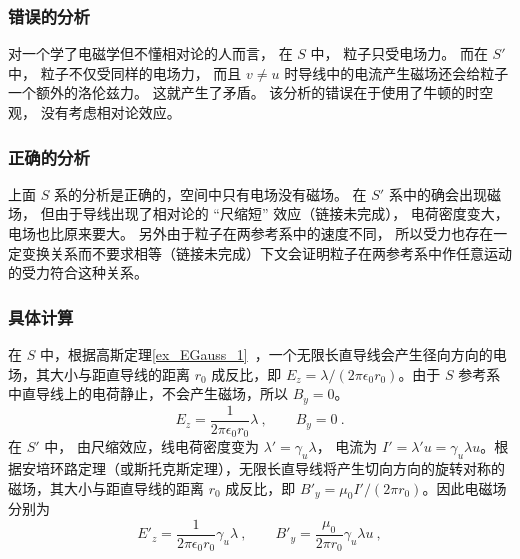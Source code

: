 \subsubsection{错误的分析}
对一个学了电磁学但不懂相对论的人而言， 在 $S$ 中， 粒子只受电场力。 而在 $S'$ 中， 粒子不仅受同样的电场力， 而且 $v \ne u$ 时导线中的电流产生磁场还会给粒子一个额外的洛伦兹力。 这就产生了矛盾。 该分析的错误在于使用了牛顿的时空观， 没有考虑相对论效应。

\subsubsection{正确的分析}
上面 $S$ 系的分析是正确的，空间中只有电场没有磁场。 在 $S'$ 系中的确会出现磁场， 但由于导线出现了相对论的 “尺缩短” 效应（链接未完成）， 电荷密度变大， 电场也比原来要大。 另外由于粒子在两参考系中的速度不同， 所以受力也存在一定变换关系而不要求相等（链接未完成）下文会证明粒子在两参考系中作任意运动的受力符合这种关系。

\subsubsection{具体计算}
在 $S$ 中，根据高斯定理\autoref{ex_EGauss_1}~，一个无限长直导线会产生径向方向的电场，其大小与距直导线的距离 $r_0$ 成反比，即 $E_z=\lambda/(2\pi\epsilon_0r_0)$。由于 $S$ 参考系中直导线上的电荷静止，不会产生磁场，所以 $B_y=0$。
\begin{equation}
E_{z} = \frac{1}{2\pi\epsilon_0 r_0} \lambda~,
\qquad
B_{y} = 0~.
\end{equation}
在 $S'$ 中， 由尺缩效应，线电荷密度变为 $\lambda' = \gamma_u \lambda$， 电流为 $I' = \lambda' u = \gamma_u \lambda u$。根据安培环路定理（或斯托克斯定理），无限长直导线将产生切向方向的旋转对称的磁场，其大小与距直导线的距离 $r_0$ 成反比，即 $B'_y=\mu_0 I' /(2\pi r_0)$。因此电磁场分别为
\begin{equation}
E'_z = \frac{1}{2\pi\epsilon_0 r_0} \gamma_u \lambda~,
\qquad
B'_y = \frac{\mu_0}{2\pi r_0}\gamma_u \lambda u~,
\end{equation}

